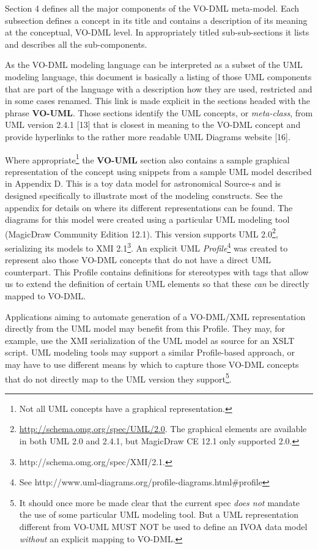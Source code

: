 \documentclass[10pt,a4paper]{ivoa}
\begin{document}
Section 4 defines all the major components of the VO-DML meta-model.
Each subsection defines a concept in its title and contains a
description of its meaning at the conceptual, VO-DML level. In
appropriately titled sub-sub-sections it lists and describes all the
sub-components.

As the VO-DML modeling language can be interpreted as a subset of the
UML modeling language, this document is basically a listing of those UML
components that are part of the language with a description how they are
used, restricted and in some cases renamed. This link is made explicit
in the sections headed with the phrase \textbf{VO-UML}. Those sections
identify the UML concepts, or \emph{meta-class}, from UML version 2.4.1
{[}13{]} that is closest in meaning to the VO-DML concept and provide
hyperlinks to the rather more readable UML Diagrams website {[}16{]}.

Where appropriate\footnote{Not all UML concepts have a graphical
  representation.} the \textbf{VO-UML} section also contains a sample
graphical representation of the concept using snippets from a sample UML
model described in Appendix D. This is a toy data model for astronomical
Source-s and is designed specifically to illustrate most of the modeling
constructs. See the appendix for details on where its different
representations can be found. The diagrams for this model were created
using a particular UML modeling tool (MagicDraw Community Edition 12.1).
This version supports UML 2.0\footnote{\url{http://schema.omg.org/spec/UML/2.0}.
  The graphical elements are available in both UML 2.0 and 2.4.1, but
  MagicDraw CE 12.1 only supported 2.0.}, serializing its models to XMI
2.1\footnote{http://schema.omg.org/spec/XMI/2.1.}. An explicit UML
\emph{Profile}\footnote{See
  http://www.uml-diagrams.org/profile-diagrams.html\#profile} was
created to represent also those VO-DML concepts that do not have a
direct UML counterpart. This Profile contains definitions for
stereotypes with tags that allow us to extend the definition of certain
UML elements so that these \emph{can} be directly mapped to VO-DML.

Applications aiming to automate generation of a VO-DML/XML
representation directly from the UML model may benefit from this
Profile. They may, for example, use the XMI serialization of the UML
model as source for an XSLT script. UML modeling tools may support a
similar Profile-based approach, or may have to use different means by
which to capture those VO-DML concepts that do not directly map to the
UML version they support\footnote{It should once more be made clear that
  the current spec \emph{does not} mandate the use of some particular
  UML modeling tool. But a UML representation different from VO-UML MUST
  NOT be used to define an IVOA data model \emph{without} an explicit
  mapping to VO-DML.}.
\end{document}

